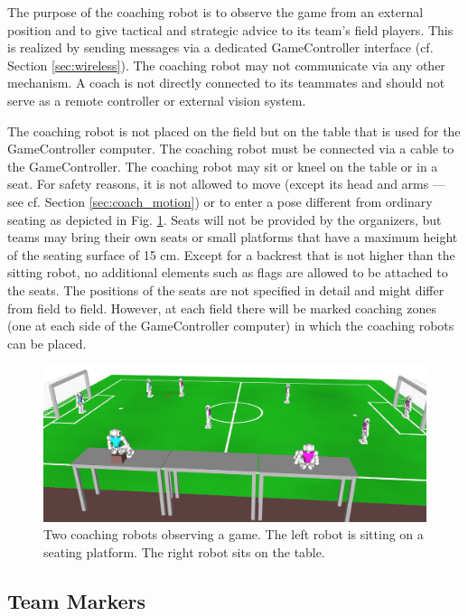 \documentclass[12pt]{article}
\newcommand{\cf}{\mbox{cf.}\xspace}
\begin{document}
The purpose of the coaching robot is to observe the game from an external position and to give tactical and strategic advice to its team's field players. This is realized by sending messages via a dedicated GameController interface (\cf Section \ref{sec:wireless}). The coaching robot may not communicate via any other mechanism.  A coach is not directly connected to its teammates and should not serve as a remote controller or external vision system.

The coaching robot is not placed on the field but on the table that is used for the GameController computer.  The coaching robot must be connected via a cable to the GameController. The coaching robot may sit or kneel on the table or in a seat. For safety reasons, it is not allowed to move (except its head and arms --- see \cf Section \ref{sec:coach_motion}) or to enter a pose different from ordinary seating as depicted in Fig. \ref{fig:coaches}.  Seats will not be provided by the organizers, but teams may bring their own seats or small platforms that have a maximum height of the seating surface of 15 cm. Except for a backrest that is not higher than the sitting robot, no additional elements such as flags are allowed to be attached to the seats. The positions of the seats are not specified in detail and might differ from field to field. However, at each field there will be marked coaching zones (one at each side of the GameController computer) in which the coaching robots can be placed.

\begin{figure}[t]
\centerline{\includegraphics[width=\columnwidth]{figs/coaching-robots}}
\caption{Two coaching robots observing a game. The left robot is sitting on a seating platform. The right robot sits on the table.}
\label{fig:coaches}
\end{figure}
 

\subsection{Team Markers}
\label{sec:team_markers}
\end{document}
